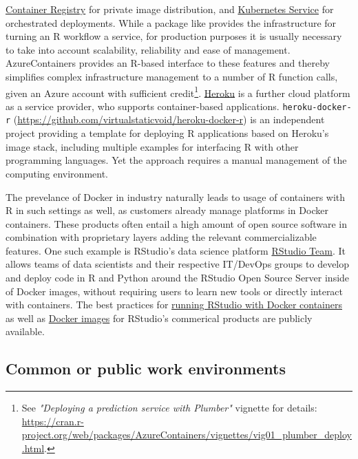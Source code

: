 \href{https://azure.microsoft.com/en-us/services/container-registry/}{Container
Registry} for private image distribution, and
\href{https://azure.microsoft.com/en-us/services/kubernetes-service/}{Kubernetes
Service} for orchestrated deployments. While a package like
 provides the infrastructure for turning an R workflow
a service, for production purposes it is usually necessary to take into
account scalability, reliability and ease of management. AzureContainers
provides an R-based interface to these features and thereby simplifies
complex infrastructure management to a number of R function calls, given
an Azure account with sufficient
credit\footnote{See \emph{"Deploying a prediction service with Plumber"} vignette for details:  \href{https://cran.r-project.org/web/packages/AzureContainers/vignettes/vig01_plumber_deploy.html}{https://cran.r-project.org/web/packages/AzureContainers/vignettes/vig01\_plumber\_deploy.html}.}.
\href{https://www.heroku.com/}{Heroku} is a further cloud platform as a
service provider, who supports container-based applications.
\texttt{heroku-docker-r}
(\url{https://github.com/virtualstaticvoid/heroku-docker-r}) is an
independent project providing a template for deploying R applications
based on Heroku's image stack, including multiple examples for
interfacing R with other programming languages. Yet the approach
requires a manual management of the computing environment.

The prevelance of Docker in industry naturally leads to usage of
containers with R in such settings as well, as customers already manage
platforms in Docker containers. These products often entail a high
amount of open source software in combination with proprietary layers
adding the relevant commercializable features. One such example is
RStudio's data science platform
\href{https://rstudio.com/products/team/}{RStudio Team}. It allows teams
of data scientists and their respective IT/DevOps groups to develop and
deploy code in R and Python around the RStudio Open Source Server inside
of Docker images, without requiring users to learn new tools or directly
interact with containers. The best practices for
\href{https://support.rstudio.com/hc/en-us/articles/360021594513-Running-RStudio-with-Docker-containers}{running
RStudio with Docker containers} as well as
\href{https://github.com/rstudio/rstudio-docker-products}{Docker images}
for RStudio's commerical products are publicly available.

\hypertarget{common-or-public-work-environments}{%
\subsection{Common or public work
environments}\label{common-or-public-work-environments}}

